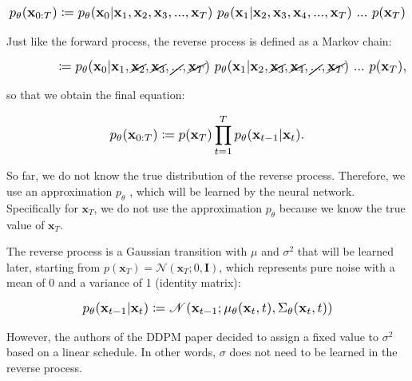 \documentclass{article}
\newcommand*{\Scale}[2][4]{\scalebox{#1}{\ensuremath{#2}}}
\begin{document}
\begin{equation}
\Scale[1.2]{ \displaystyle
p_\theta(\textbf{x}_{0:T}) \coloneq p_\theta(\textbf{x}_0|\textbf{x}_1,\textbf{x}_2,\textbf{x}_3,...,\textbf{x}_T) \ p_\theta(\textbf{x}_1|\textbf{x}_2,\textbf{x}_3,\textbf{x}_4,...,\textbf{x}_T) \ ... \  p(\textbf{x}_{T}) }
\end{equation}

Just like the forward process, the reverse process is defined as a Markov chain:

\begin{equation}
\Scale[1.2]{ \displaystyle
\hspace{3.75em} \coloneq p_\theta(\textbf{x}_0|\textbf{x}_1,\cancel{\textbf{x}_2},\cancel{\textbf{x}_3},\cancel{...},\cancel{\textbf{x}_T}) \ p_\theta(\textbf{x}_1|\textbf{x}_2,\cancel{\textbf{x}_3},\cancel{\textbf{x}_4},\cancel{...},\cancel{\textbf{x}_T}) \ ... \  p(\textbf{x}_{T}), }
\end{equation}

so that we obtain the final equation:

\begin{equation}
\Scale[1.2]{ \displaystyle
p_\theta(\textbf{x}_{0:T}) \coloneq p(\textbf{x}_T) \displaystyle \prod_{t=1}^{T} p_\theta(\textbf{x}_{t-1}|\textbf{x}_{t}). }
\end{equation}

So far, we do not know the true distribution of the reverse process. Therefore, we use an approximation $ p_\theta $ 
 , which will be learned by the neural network. Specifically for $ \textbf{x}_{T} $, we do not use the approximation $ p_\theta $ because we know the true value of $ \textbf{x}_{T} $.

The reverse process is a Gaussian transition with $ \mu $ and $ \sigma^2 $ that will be learned later, starting from $ p(\textbf{x}_T) = \mathscr{N}(\textbf{x}_T;0,\textbf{I}) $, which represents pure noise with a mean of 0 and a variance of 1 (identity matrix):

\begin{equation}
\Scale[1.2]{ \displaystyle
p_\theta(\textbf{x}_{t-1}|\textbf{x}_{t}) \coloneq \mathscr{N}(\textbf{x}_{t-1};\mu_\theta(\textbf{x}_{t},t),\Sigma_\theta(\textbf{x}_t,t)) }
\end{equation}

However, the authors of the DDPM paper decided to assign a fixed value to $ \sigma^2 $ based on a linear schedule. In other words, $ \sigma $ does not need to be learned in the reverse process.
\end{document}
